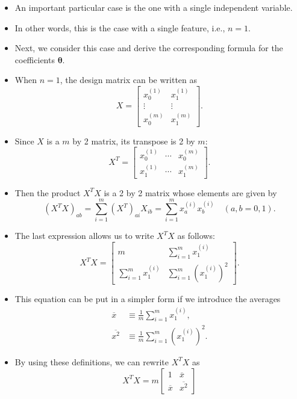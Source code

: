 \documentclass[10pt,american]{scrartcl}
\begin{document}
\begin{itemize}
\item An important particular case is the one with a single independent
variable.
\item In other words, this is the case with a single feature, i.e., $n=1$.
\item Next, we consider this case and derive the corresponding formula for
the coefficients $\boldsymbol{\theta}$.
\item When $n=1$, the design matrix can be written as
\[
X=\begin{bmatrix}x_{0}^{\left(1\right)} & x_{1}^{\left(1\right)}\\
\vdots & \vdots\\
x_{0}^{\left(m\right)} & x_{1}^{\left(m\right)}
\end{bmatrix}.
\]
\item Since $X$ is a $m$ by 2 matrix, its transpose is 2 by $m$:
\[
X^{T}=\begin{bmatrix}x_{0}^{\left(1\right)} & \cdots & x_{0}^{\left(m\right)}\\
x_{1}^{\left(1\right)} & \cdots & x_{1}^{\left(m\right)}
\end{bmatrix}.
\]
\item Then the product $X^{T}X$ is a 2 by 2 matrix whose elements are given
by
\[
\left(X^{T}X\right)_{ab}=\sum_{i=1}^{m}\left(X^{T}\right)_{ai}X_{ib}=\sum_{i=1}^{m}x_{a}^{\left(i\right)}x_{b}^{\left(i\right)}\quad\left(a,b=0,1\right).
\]
\item The last expression allows us to write $X^{T}X$ as follows:
\[
X^{T}X=\begin{bmatrix}m & \sum_{i=1}^{m}x_{1}^{\left(i\right)}\\
\sum_{i=1}^{m}x_{1}^{\left(i\right)} & \sum_{i=1}^{m}\left(x_{1}^{\left(i\right)}\right)^{2}
\end{bmatrix}.
\]
\item This equation can be put in a simpler form if we introduce the averages
\begin{align*}
\overline{x} & \equiv\frac{1}{m}\sum_{i=1}^{m}x_{1}^{\left(i\right)},\\
\overline{x^{2}} & \equiv\frac{1}{m}\sum_{i=1}^{m}\left(x_{1}^{\left(i\right)}\right)^{2}.
\end{align*}
\item By using these definitions, we can rewrite $X^{T}X$ as
\[
X^{T}X=m\begin{bmatrix}1 & \overline{x}\\
\overline{x} & \overline{x^{2}}

\end{bmatrix}\]
\end{itemize}
\end{document}
